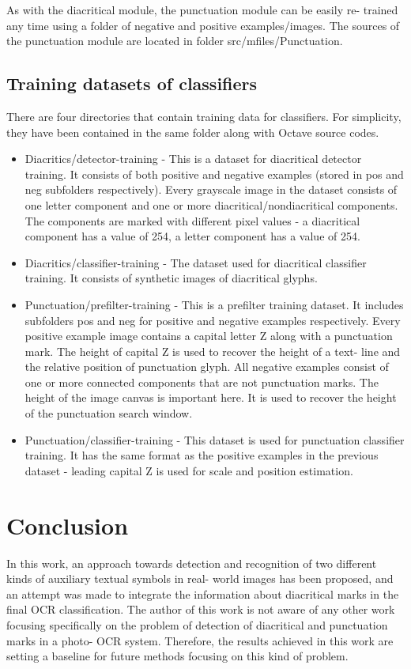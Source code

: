 \documentclass[12pt,a4paper]{report}
\begin{document}
As with the diacritical module, the punctuation module can be easily re- trained any time using a folder of negative and positive examples/images. The sources of the punctuation module are located in folder src/mfiles/Punctuation.

\section{Training datasets of classifiers}
There are four directories that contain training data for classifiers. For simplicity, they have been contained in the same folder along with Octave source codes.

\begin{itemize}
    \item Diacritics/detector-training - This is a dataset for diacritical detector training. It consists of both positive and negative examples (stored in pos and neg subfolders respectively). Every grayscale image in the dataset consists of one letter component and one or more diacritical/nondiacritical components. The components are marked with different pixel values - a diacritical component has a value of 254, a letter component has a value of 254.
    \item Diacritics/classifier-training - The dataset used for diacritical classifier training. It consists of synthetic images of diacritical glyphs.
    \item Punctuation/prefilter-training - This is a prefilter training dataset. It includes subfolders pos and neg for positive and negative examples respectively. Every positive example image contains a capital letter Z along with a punctuation mark. The height of capital Z is used to recover the height of a text- line and the relative position of punctuation glyph. All negative examples consist of one or more connected components that are not punctuation marks. The height of the image canvas is important here. It is used to recover the height of the punctuation search window.
    \item Punctuation/classifier-training - This dataset is used for punctuation classifier training. It has the same format as the positive examples in the previous dataset - leading capital Z is used for scale and position estimation.
\end{itemize}

\chapter{Conclusion}
In this work, an approach towards detection and recognition of two different kinds of auxiliary textual symbols in real- world images has been proposed, and an attempt was made to integrate the information about diacritical marks in the final OCR classification. The author of this work is not aware of any other work focusing specifically on the problem of detection of diacritical and punctuation marks in a photo- OCR system. Therefore, the results achieved in this work are setting a baseline for future methods focusing on this kind of problem.
\end{document}
